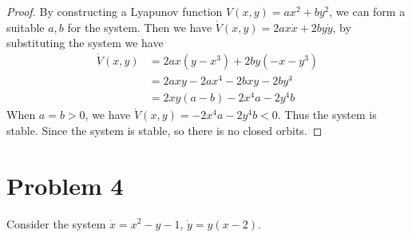 \documentclass[12pt]{exam}
\begin{document}
\begin{proof}
	By constructing a Lyapunov function $V(x,y) = ax^2 + by^2$, we can form a suitable $a,b$ for the system. Then we have $\dot{V}(x,y) = 2ax\dot{x} + 2by\dot{y}$, by substituting the system we have
	\begin{align*}
		\dot{V}(x,y) &= 2ax(y-x^3) + 2by(-x-y^3) \\
		&= 2axy - 2ax^4 - 2bxy - 2by^4 \\
		&= 2xy(a-b) - 2x^4a - 2y^4b
	\end{align*}
	When $a=b > 0$, we have $\dot{V}(x,y) = -2x^4a - 2y^4b < 0$. Thus the system is stable. Since the system is stable, so there is no closed orbits.
\end{proof}



\section*{Problem 4}
Consider the system $\dot{x} = x^2 -y-1$, $\dot{y} = y(x-2)$.
\end{document}
